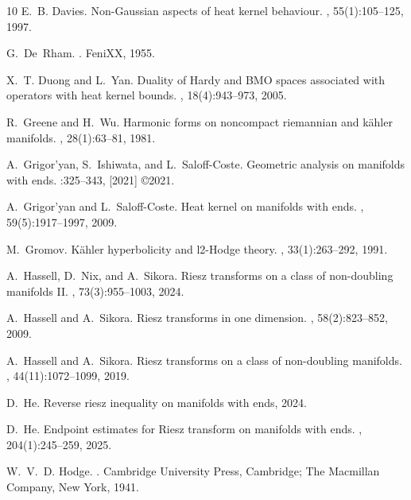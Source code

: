 \documentclass[12pt]{amsart}
\begin{document}
\begin{thebibliography}{10}
	E.~B. Davies.
	\newblock Non-{G}aussian aspects of heat kernel behaviour.
	, 55(1):105--125, 1997.
	
	G.~De~Rham.
	.
	\newblock FeniXX, 1955.
	
	X.~T. Duong and L.~Yan.
	\newblock Duality of {Hardy} and {BMO} spaces associated with operators with
	heat kernel bounds.
	, 18(4):943--973, 2005.
	
	R.~Greene and H.~Wu.
	\newblock Harmonic forms on noncompact riemannian and k{\"a}hler manifolds.
	, 28(1):63--81, 1981.
	
	A.~Grigor'yan, S.~Ishiwata, and L.~Saloff-Coste.
	\newblock Geometric analysis on manifolds with ends.
	:325--343, [2021] \copyright 2021.
	
	A.~Grigor'yan and L.~Saloff-Coste.
	\newblock Heat kernel on manifolds with ends.
	, 59(5):1917--1997, 2009.
	
	M.~Gromov.
	\newblock K{\"a}hler hyperbolicity and l2-{Hodge} theory.
	, 33(1):263--292, 1991.
	
	A.~Hassell, D.~Nix, and A.~Sikora.
	\newblock Riesz transforms on a class of non-doubling manifolds {II}.
	, 73(3):955--1003, 2024.
	
	A.~Hassell and A.~Sikora.
	\newblock Riesz transforms in one dimension.
	, 58(2):823--852, 2009.
	
	A.~Hassell and A.~Sikora.
	\newblock Riesz transforms on a class of non-doubling manifolds.
	, 44(11):1072--1099, 2019.
	
	D.~He.
	\newblock Reverse riesz inequality on manifolds with ends, 2024.
	
	D.~He.
	\newblock Endpoint estimates for {R}iesz transform on manifolds with ends.
	, 204(1):245--259, 2025.
	
	W.~V.~D. Hodge.
	.
	\newblock Cambridge University Press, Cambridge; The Macmillan Company, New
	York, 1941.
	

\end{thebibliography}
\end{document}
